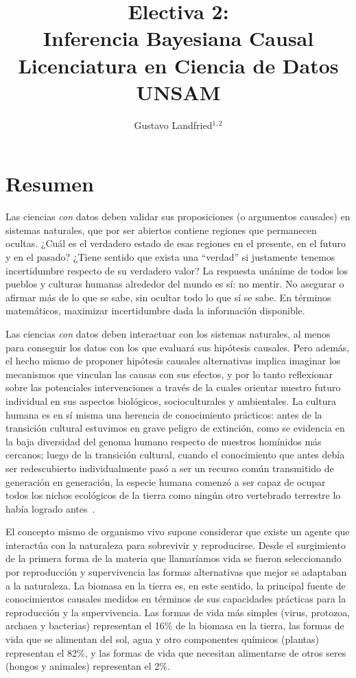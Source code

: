 \documentclass[11pt]{article}
\title{\huge Electiva 2: \\ Inferencia Bayesiana Causal \\[0.4cm]  \LARGE Licenciatura en Ciencia de Datos UNSAM}
\author{Gustavo Landfried$^{1,2}$}
\affil{\footnotesize 1. Departamento de Computación. Facultad de Ciencias Exactas y Naturales. Universidad de Buenos Aires.}
\affil{\vspace{-0.2cm}\footnotesize 2. Bayes Plurinacional}
\affil[]{Correspondencia: \texttt{glandfried@dc.uba.ar}}
\begin{document}
\maketitle

\section{Resumen}

Las ciencias \emph{con} datos deben validar sus proposiciones (o argumentos causales) en sistemas naturales, que por ser abiertos contiene regiones que permanecen ocultas.
¿Cuál es el verdadero estado de esas regiones en el presente, en el futuro y en el pasado?
¿Tiene sentido que exista una ``verdad'' si justamente tenemos incertidumbre respecto de su verdadero valor?
La respuesta unánime de todos los pueblos y culturas humanas alrededor del mundo es sí: no mentir.
No asegurar o afirmar más de lo que se sabe, sin ocultar todo lo que sí se sabe.
En términos matemáticos, maximizar incertidumbre dada la información disponible.


Las ciencias \emph{con} datos deben interactuar con los sistemas naturales, al menos para conseguir los datos con los que evaluará sus hipótesis causales.
Pero además, el hecho mismo de proponer hipótesis causales alternativas implica imaginar los mecanismos que vinculan las causas con sus efectos, y por lo tanto reflexionar sobre las potenciales intervenciones a través de la cuales orientar nuestro futuro individual en sus aspectos biológicos, socioculturales y ambientales.
La cultura humana es en sí misma una herencia de conocimiento prácticos: antes de la transición cultural estuvimos en grave peligro de extinción, como se evidencia en la baja diversidad del genoma humano respecto de nuestros homínidos más cercanos\cite{Hrdy2009}; luego de la transición cultural, cuando el conocimiento que antes debía ser redescubierto individualmente pasó a ser un recurso común transmitido de generación en generación, la especie humana comenzó a ser capaz de ocupar todos los nichos ecológicos de la tierra como ningún otro vertebrado terrestre lo había logrado antes~\cite{Boyd2011}.


El concepto mismo de organismo vivo supone considerar que existe un agente que interactúa con la naturaleza para sobrevivir y reproducirse.
Desde el surgimiento de la primera forma de la materia que llamaríamos vida se fueron seleccionando por reproducción y supervivencia las formas alternativas que mejor se adaptaban a la naturaleza.
La biomasa en la tierra es, en este sentido, la principal fuente de conocimientos causales medidos en términos de sus capacidades prácticas para la reproducción y la supervivencia.
Las formas de vida más simples (virus, protozoa, archaea y bacterias) representan el 16\% de la biomasa en la tierra, las formas de vida que se alimentan del sol, agua y otro componentes químicos (plantas) representan el 82\%, y las formas de vida que necesitan alimentarse de otros seres (hongos y animales) representan el 2\%.
\end{document}
